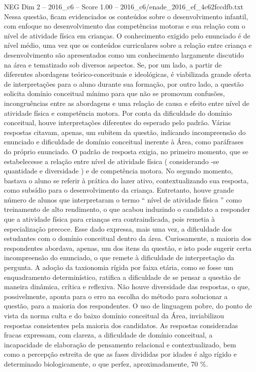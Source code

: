 \begin{textsample}{NEG Dim 2 – 2016\_c6 – Score 1.00 – 2016\_c6/enade\_2016\_ef\_4c62fccdfb.txt}
Nessa questão, ficam evidenciados os conteúdos sobre o desenvolvimento infantil, com enfoque no desenvolvimento das competências motoras e sua relação com o nível de atividade física em crianças.
O conhecimento exigido pelo enunciado é de nível médio, uma vez que os conteúdos curriculares sobre a relação entre criança e desenvolvimento são apresentados como um conhecimento largamente discutido na área e tematizado sob diversos aspectos.
Se, por um lado, a partir de diferentes abordagens teórico-conceituais e ideológicas, é viabilizada grande oferta de interpretações para o aluno durante sua formação, por outro lado, a questão solicita domínio conceitual mínimo para que não se promovam confusões, incongruências entre as abordagens e uma relação de causa e efeito entre nível de atividade física e competência motora.
Por conta da dificuldade do domínio conceitual, houve interpretações diferentes do esperado pelo padrão.
Várias respostas citavam, apenas, um subitem da questão, indicando incompreensão do enunciado e dificuldade de domínio conceitual inerente à Área, como paráfrases do próprio enunciado.
O padrão de resposta exigia, no primeiro momento, que se estabelecesse a relação entre nível de atividade física ( considerando -se quantidade e diversidade ) e de competência motora.
No segundo momento, bastava o aluno se referir à prática do lazer ativo, contextualizando sua resposta, como subsídio para o desenvolvimento da criança.
Entretanto, houve grande número de alunos que interpretaram o termo “ nível de atividade física ” como treinamento de alto rendimento, o que acabou induzindo o candidato a responder que a atividade física para crianças era contraindicada, pois remetia à especialização precoce.
Esse dado expressa, mais uma vez, a dificuldade dos estudantes com o domínio conceitual dentro da área.
Curiosamente, a maioria dos respondentes abordava, apenas, um dos itens da questão, e isto pode sugerir certa incompreensão do enunciado, o que remete à dificuldade de interpretação da pergunta.
A adoção da taxionomia rígida por faixa etária, como se fosse um enquadramento determinístico, ratifica a dificuldade de se pensar a questão de maneira dinâmica, crítica e reflexiva.
Não houve diversidade das respostas, o que, possivelmente, aponta para o erro na escolha do método para solucionar a questão, para a maioria dos respondentes.
O uso de linguagem pobre, do ponto de vista da norma culta e do baixo domínio conceitual da Área, inviabilizou respostas consistentes pela maioria dos candidatos.
As respostas consideradas fracas expressam, com clareza, a dificuldade de domínio conceitual, a incapacidade de elaboração de pensamento relacional e contextualizado, bem como a percepção estreita de que as fases divididas por idades é algo rígido e determinado biologicamente, o que perfez, aproximadamente, 70 \%.

\end{textsample}
